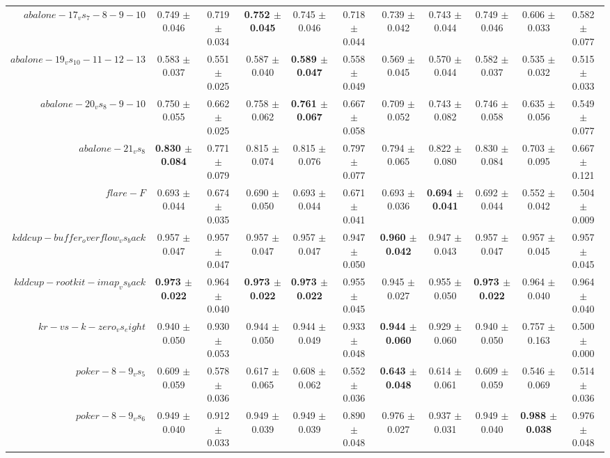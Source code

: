 \begin{table}[!ht]
{\begin{tabular}{r c c c c c c c c c c}
$abalone-17_vs_7-8-9-10$ & 0.749 $\pm$ 0.046 & 0.719 $\pm$ 0.034 & \textbf{0.752 $\pm$ 0.045} & 0.745 $\pm$ 0.046 & 0.718 $\pm$ 0.044 & 0.739 $\pm$ 0.042 & 0.743 $\pm$ 0.044 & 0.749 $\pm$ 0.046 & 0.606 $\pm$ 0.033 & 0.582 $\pm$ 0.077 \\
$abalone-19_vs_10-11-12-13$ & 0.583 $\pm$ 0.037 & 0.551 $\pm$ 0.025 & 0.587 $\pm$ 0.040 & \textbf{0.589 $\pm$ 0.047} & 0.558 $\pm$ 0.049 & 0.569 $\pm$ 0.045 & 0.570 $\pm$ 0.044 & 0.582 $\pm$ 0.037 & 0.535 $\pm$ 0.032 & 0.515 $\pm$ 0.033 \\
$abalone-20_vs_8-9-10$ & 0.750 $\pm$ 0.055 & 0.662 $\pm$ 0.025 & 0.758 $\pm$ 0.062 & \textbf{0.761 $\pm$ 0.067} & 0.667 $\pm$ 0.058 & 0.709 $\pm$ 0.052 & 0.743 $\pm$ 0.082 & 0.746 $\pm$ 0.058 & 0.635 $\pm$ 0.056 & 0.549 $\pm$ 0.077 \\
$abalone-21_vs_8$ & \textbf{0.830 $\pm$ 0.084} & 0.771 $\pm$ 0.079 & 0.815 $\pm$ 0.074 & 0.815 $\pm$ 0.076 & 0.797 $\pm$ 0.077 & 0.794 $\pm$ 0.065 & 0.822 $\pm$ 0.080 & 0.830 $\pm$ 0.084 & 0.703 $\pm$ 0.095 & 0.667 $\pm$ 0.121 \\
$flare-F$ & 0.693 $\pm$ 0.044 & 0.674 $\pm$ 0.035 & 0.690 $\pm$ 0.050 & 0.693 $\pm$ 0.044 & 0.671 $\pm$ 0.041 & 0.693 $\pm$ 0.036 & \textbf{0.694 $\pm$ 0.041} & 0.692 $\pm$ 0.044 & 0.552 $\pm$ 0.042 & 0.504 $\pm$ 0.009 \\
$kddcup-buffer_overflow_vs_back$ & 0.957 $\pm$ 0.047 & 0.957 $\pm$ 0.047 & 0.957 $\pm$ 0.047 & 0.957 $\pm$ 0.047 & 0.947 $\pm$ 0.050 & \textbf{0.960 $\pm$ 0.042} & 0.947 $\pm$ 0.043 & 0.957 $\pm$ 0.047 & 0.957 $\pm$ 0.045 & 0.957 $\pm$ 0.045 \\
$kddcup-rootkit-imap_vs_back$ & \textbf{0.973 $\pm$ 0.022} & 0.964 $\pm$ 0.040 & \textbf{0.973 $\pm$ 0.022} & \textbf{0.973 $\pm$ 0.022} & 0.955 $\pm$ 0.045 & 0.945 $\pm$ 0.027 & 0.955 $\pm$ 0.050 & \textbf{0.973 $\pm$ 0.022} & 0.964 $\pm$ 0.040 & 0.964 $\pm$ 0.040 \\
$kr-vs-k-zero_vs_eight$ & 0.940 $\pm$ 0.050 & 0.930 $\pm$ 0.053 & 0.944 $\pm$ 0.050 & 0.944 $\pm$ 0.049 & 0.933 $\pm$ 0.048 & \textbf{0.944 $\pm$ 0.060} & 0.929 $\pm$ 0.060 & 0.940 $\pm$ 0.050 & 0.757 $\pm$ 0.163 & 0.500 $\pm$ 0.000 \\
$poker-8-9_vs_5$ & 0.609 $\pm$ 0.059 & 0.578 $\pm$ 0.036 & 0.617 $\pm$ 0.065 & 0.608 $\pm$ 0.062 & 0.552 $\pm$ 0.036 & \textbf{0.643 $\pm$ 0.048} & 0.614 $\pm$ 0.061 & 0.609 $\pm$ 0.059 & 0.546 $\pm$ 0.069 & 0.514 $\pm$ 0.036 \\
$poker-8-9_vs_6$ & 0.949 $\pm$ 0.040 & 0.912 $\pm$ 0.033 & 0.949 $\pm$ 0.039 & 0.949 $\pm$ 0.039 & 0.890 $\pm$ 0.048 & 0.976 $\pm$ 0.027 & 0.937 $\pm$ 0.031 & 0.949 $\pm$ 0.040 & \textbf{0.988 $\pm$ 0.038} & 0.976 $\pm$ 0.048 \\

\end{tabular}}
\end{table}
